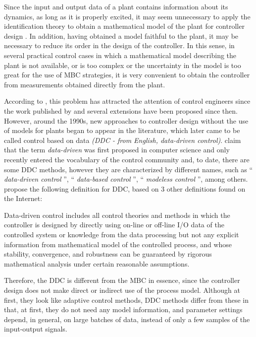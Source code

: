 Since the input and output data of a plant contains information about its dynamics, as long as it is properly excited, it may seem unnecessary to apply the identification theory to obtain a mathematical model of the plant for controller design \citep{ikeda2001}.
In addition, having obtained a model faithful to the plant, it may be necessary to reduce its order in the design of the controller.
In this sense, in several practical control cases in which a mathematical model describing the plant is not available, or is too complex or the uncertainty in the model is too great for the use of MBC strategies, it is very convenient to obtain the controller from measurements obtained directly from the plant.

According to \cite{campi2002}, this problem has attracted the attention of control engineers since the work published by \cite{ziegler1942} and several extensions have been proposed since then. However, around the 1990s, new approaches to controller design without the use of models for plants began to appear in the literature, which later came to be called control based on data \emph{(DDC - from English, data-driven control)}.
%
\cite{hou2013} claim that the term \emph{data-driven} was first proposed in computer science and only recently entered the vocabulary of the control community and, to date, there are some DDC methods, however they are characterized by different names, such as `` \emph{data-driven control} '', `` \emph{data-based control} '', `` \emph{modeless control} '', among others. \cite{hou2013} propose the following definition for DDC, based on 3 other definitions found on the Internet:

\begin{defn}\citep{hou2013}
Data-driven control includes all control theories and methods in which the controller is designed by directly using on-line or off-line I/O data of the controlled system or knowledge from the data processing but not any explicit information from mathematical model of the controlled process, and whose stability, convergence, and robustness can be guaranteed by rigorous mathematical analysis under certain reasonable assumptions.
\end{defn}


Therefore, the DDC is different from the MBC in essence, since the controller design does not make direct or indirect use of the process model.  
Although at first, they look like adaptive control methods, DDC methods differ from these in that, at first, they do not need any model information, and parameter settings depend, in general, on large batches of data, instead of only a few samples of the input-output signals. %

